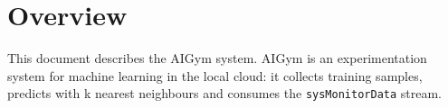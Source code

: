\documentclass[a4paper]{arrowhead}
\begin{document}
\sloppy

\ArrowheadSetup

\begin{center}
  \vspace*{1cm}
  \huge{\arrowtitle}

  \vspace*{0.2cm}
  \LARGE{\arrowtype}
  \vspace*{1cm}

  \vspace*{\fill}


  \vspace*{1cm}
  \vspace*{\fill}

  \begin{abstract}
    This document describes the AIGym support system of the Eclipse Arrowhead 5.2.2 framework, as implemented in \texttt{ah5-AIGym-java-spring} of the primary Java source tree (\texttt{Eclipse-Arrowhead-java}) and deployed with the standalone Compose definition of that folder.
  \end{abstract}

  \vspace*{1cm}
\end{center}

\newpage

\tableofcontents
\newpage

\section{Overview}
\label{sec:overview}

This document describes the AIGym system. AIGym is an experimentation system for machine learning in the local cloud: it collects training samples, predicts with k nearest neighbours and consumes the \texttt{sysMonitorData} stream.
\end{document}
